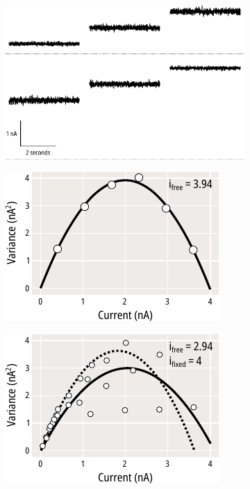 \begin{figure}[h]
	\centering
	\begin{subfigure}[t]{0.3\textwidth}
		\caption{}\label{ch4fig:simulated_noise_1}
		\centering
		\includegraphics[width=\textwidth]{simulated_noise_1.pdf}
	\end{subfigure}
	\hfill
	\begin{subfigure}[t]{0.3\textwidth}
		\caption{}\label{ch4fig:simulated_noise_2}
		\centering
		\includegraphics[width=\textwidth]{simulated_noise_2.pdf}
	\end{subfigure}
	\hfill
	\begin{subfigure}[t]{0.3\textwidth}
		\caption{}\label{ch4fig:simulated_noise_3}
		\centering
		\includegraphics[width=\textwidth]{simulated_noise_3.pdf}

\end{subfigure}
\end{figure}
